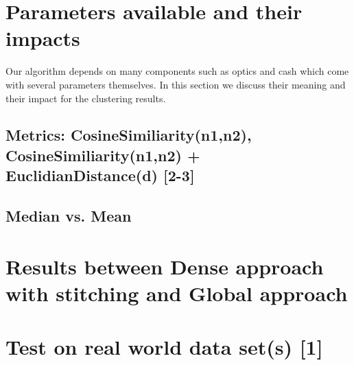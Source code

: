 \section{Parameters available and their impacts}
Our algorithm depends on many components such as \gls{optics} and \gls{cash} which come with several parameters themselves. In this section we discuss their meaning and their impact for the clustering results.

\subsection{Metrics: CosineSimiliarity(n1,n2), CosineSimiliarity(n1,n2) + EuclidianDistance(d) [2-3]}

\subsection{Median vs.  Mean}

\section{Results between Dense approach with stitching and Global approach}

\section{Test on real world data set(s) [1]}

